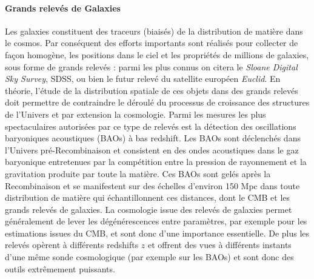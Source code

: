\paragraph{Grands relevés de Galaxies}
Les galaxies  constituent des traceurs (biaisés) de la distribution de matière dans le cosmos. Par conséquent des efforts importants sont réalisés pour collecter de façon homogène, les positions dans le ciel et les propriétés de millions de galaxies, sous forme de grands relevés : parmi les plus connus on citera le \textit{Sloane Digital Sky Survey}, SDSS, ou bien le futur relevé du satellite européen \textit{Euclid}. En théorie, l'étude de la distribution spatiale de ces objets dans des grands relevés doit permettre de contraindre le déroulé du processus de croissance des structures de l'Univers et par extension la cosmologie. Parmi les mesures les plus spectaculaires autorisées par ce type de relevés est la détection des oscillations baryoniques acoustiques (BAOs) à bas redshift. Les BAOs sont déclenchés dans l'Univers pré-Recombinaison et consistent en des ondes acoustiques dans le gaz baryonique entretenues par la compétition entre la pression de rayonnement et la gravitation produite par toute la matière. Ces BAOs sont gelés après la Recombinaison et se manifestent sur des échelles d'environ 150 Mpc dans toute distribution de matière qui échantillonnent ces distances, dont le CMB et les grands relevés de galaxies.  La cosmologie issue des relevés de galaxies permet généralement de lever les dégénérescences entre paramètres, par exemple pour les estimations issues du CMB, et sont donc d'une importance essentielle. De plus les relevés opèrent à différents redshifts $z$ et offrent  des vues à différents instants d'une même sonde cosmologique (par exemple sur les BAOs) et sont donc des outils extrêmement puissants.

